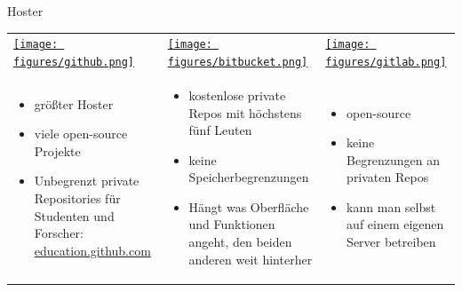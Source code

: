 \begin{frame}{Hoster}
  \begin{tabu}{@{} X[,C] @{} X[,C] @{} X[,C] @{}}
    \href{https://github.com}{\texttt{[image: figures/github.png]}} &
    \href{https://bitbucket.org}{\texttt{[image: figures/bitbucket.png]}} &
    \href{https://gitlab.com}{\texttt{[image: figures/gitlab.png]}} \\
    \begin{itemize}
      \item größter Hoster
      \item viele open-source Projekte
      \item Unbegrenzt private Repositories für Studenten und Forscher:  \newline
        \href{http://education.github.com}{education.github.com}
    \end{itemize}
    &
    \begin{itemize}
      \item kostenlose private Repos mit höchstens fünf Leuten
      \item keine Speicherbegrenzungen
      \item Hängt was Oberfläche und Funktionen angeht, den beiden anderen weit hinterher
    \end{itemize}
    &
    \begin{itemize}
      \item open-source
      \item keine Begrenzungen an privaten Repos
      \item kann man selbst auf einem eigenen Server betreiben
    \end{itemize}
  \end{tabu}
  \begin{center}
  \end{center}
\end{frame}

